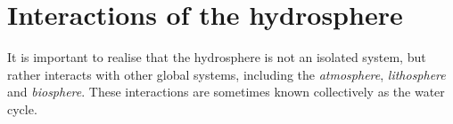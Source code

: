     \section{Interactions of the hydrosphere}
            \nopagebreak
      \label{m38138*id334443}It is important to realise that the hydrosphere is not an isolated system, but rather interacts with other global systems, including the \textsl{atmosphere}, \textsl{lithosphere} and \textsl{biosphere}. These interactions are sometimes known collectively as the water cycle.\par 
{}
      \label{m38138*id8754}
